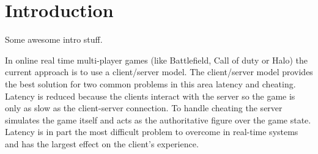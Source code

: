
\section{Introduction}
\label{sec:Intro}

Some awesome intro stuff.

In online real time multi-player games (like Battlefield, Call of duty or Halo) the current approach is to use a client/server model. The client/server model provides the best solution for two common problems in this area latency and cheating. Latency is reduced because the clients interact with the server so the game is only as slow as the client-server connection. To handle cheating the server simulates the game itself and acts as the authoritative figure over the game state. Latency is in part the most difficult problem to overcome in real-time systems and has the largest effect on the client’s experience.
